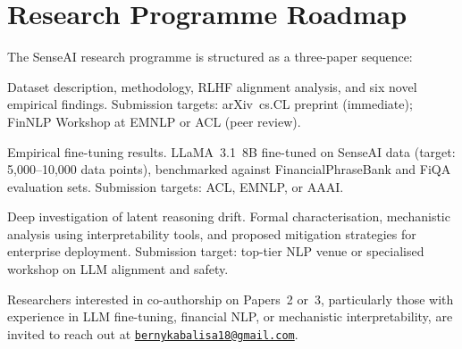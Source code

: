 \documentclass[11pt,a4paper]{article}
\begin{document}
\section{Research Programme Roadmap}
\label{app:roadmap}

The SenseAI research programme is structured as a three-paper sequence:

\begin{description}[leftmargin=2em, style=nextline,
                    font=\bfseries\color{darkblue}]

  \item[Paper~1 (this paper).]
    Dataset description, methodology, RLHF alignment analysis, and six novel
    empirical findings. Submission targets: arXiv~cs.CL preprint (immediate);
    FinNLP Workshop at EMNLP or ACL (peer review).

  \item[Paper~2 (planned).]
    Empirical fine-tuning results. LLaMA~3.1~8B fine-tuned on SenseAI data
    (target: 5,000--10,000 data points), benchmarked against
    FinancialPhraseBank and FiQA evaluation sets. Submission targets: ACL,
    EMNLP, or AAAI.

  \item[Paper~3 (planned).]
    Deep investigation of latent reasoning drift. Formal characterisation,
    mechanistic analysis using interpretability tools, and proposed mitigation
    strategies for enterprise deployment. Submission target: top-tier NLP venue
    or specialised workshop on LLM alignment and safety.

\end{description}

Researchers interested in co-authorship on Papers~2 or~3, particularly those with
experience in LLM fine-tuning, financial NLP, or mechanistic interpretability, are
invited to reach out at
\href{mailto:bernykabalisa18@gmail.com}{\texttt{bernykabalisa18@gmail.com}}.
\end{document}
